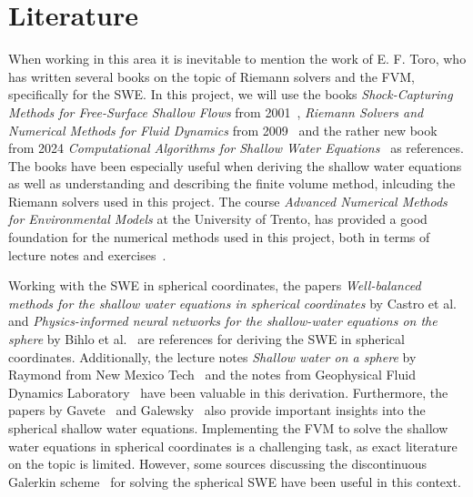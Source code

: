 \section{Literature}
When working in this area it is inevitable to mention the work of E. F. Toro, who has written several books on the topic of Riemann solvers and the FVM, specifically for the SWE.
In this project, we will use the books \textit{Shock-Capturing Methods for Free-Surface Shallow Flows} from 2001~\cite{Toro2001-Shock}, \textit{Riemann Solvers and Numerical Methods for Fluid Dynamics} from 2009~\cite{Toro2009-Riemann} and the rather new book from 2024 \textit{Computational Algorithms for Shallow Water Equations}~\cite{Toro2024} as references.
The books have been especially useful when deriving the shallow water equations as well as understanding and describing the finite volume method, inlcuding the Riemann solvers used in this project.
The course \textit{Advanced Numerical Methods for Environmental Models} at the University of Trento, has provided a good foundation for the numerical methods used in this project, both in terms of lecture notes and exercises~\cite{trento_course}.

Working with the SWE in spherical coordinates, the papers \textit{Well-balanced methods for the shallow water equations in spherical coordinates} by Castro et al.~\cite{Castro2017} and \textit{Physics-informed neural networks for the shallow-water equations on the sphere} by Bihlo et al.~\cite{Bihlo2022} are references for deriving the SWE in spherical coordinates.
Additionally, the lecture notes \textit{Shallow water on a sphere} by Raymond from New Mexico Tech~\cite{Raymond} and the notes from Geophysical Fluid Dynamics Laboratory~\cite{shallow_water_gfdl} have been valuable in this derivation.
Furthermore, the papers by Gavete~\cite{Gavete_2009} and Galewsky~\cite{Galewsky_2004} also provide important insights into the spherical shallow water equations.
Implementing the FVM to solve the shallow water equations in spherical coordinates is a challenging task, as exact literature on the topic is limited.
However, some sources discussing the discontinuous Galerkin scheme~\cite{Hesthaven2008} for solving the spherical SWE have been useful in this context.


